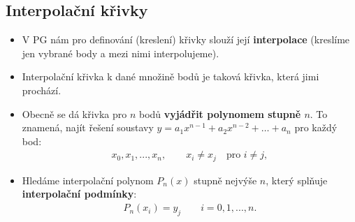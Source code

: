 \subsection{Interpolační křivky}
\begin{itemize}
    \item V PG nám pro definování (kreslení) křivky slouží její \textbf{interpolace} (kreslíme jen vybrané body a mezi nimi interpolujeme).
    \item Interpolační křivka k dané množině bodů je taková křivka, která jimi prochází.
    \item Obecně se dá křivka pro $ n $ bodů \textbf{vyjádřit polynomem stupně $ n $}. To znamená, najít řešení soustavy $y = a_1x^{n - 1} + a_2x^{n - 2} + \ldots + a_n$ pro každý bod:
          \begin{equation*}
              \begin{array}{c}
                  x_{0},x_{1},...,x_{n},  \quad \quad x_{i} \neq x_{j} \quad \textrm{pro }  i \neq j,
              \end{array}
          \end{equation*}
    \item Hledáme interpolační polynom $P_{n}(x)$ stupně nejvýše $n$, který splňuje \textbf{interpolační podmínky}:
          \begin{equation*}
              \begin{array}{c}
                  P_{n}(x_{i}) = y_{j} \quad \quad i = 0,1,...,n.
              \end{array}
          \end{equation*}
\end{itemize}

